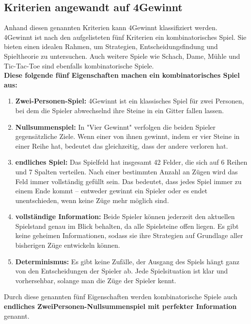 \subsection*{Kriterien angewandt auf 4Gewinnt}
Anhand diesen genannten Kriterien kann 4Gewinnt klassifiziert werden. 4Gewinnt ist nach den aufgelisteten fünf Kriterien ein kombinatorisches Spiel. Sie bieten einen idealen Rahmen, um Strategien, Entscheidungsfindung und Spieltheorie zu untersuchen. Auch weitere Spiele wie Schach, Dame, Mühle und Tic-Tac-Toe sind ebenfalls kombinatorische Spiele. \\

\textbf{Diese folgende fünf Eigenschaften machen ein kombinatorisches Spiel aus:}
\begin{enumerate}
	\item   \textbf{Zwei-Personen-Spiel: }4Gewinnt ist ein klassisches Spiel für zwei Personen, bei dem die Spieler abwechselnd ihre Steine in ein Gitter fallen lassen. 
	\item 	\textbf{Nullsummenspiel: }In "Vier Gewinnt" verfolgen die beiden Spieler gegensätzliche Ziele. Wenn einer von ihnen gewinnt, indem er vier Steine in einer Reihe hat, bedeutet das gleichzeitig, dass der andere verloren hat.
	\item 	\textbf{endliches Spiel: } Das Spielfeld hat insgesamt 42 Felder, die sich auf 6 Reihen und 7 Spalten verteilen. Nach einer bestimmten Anzahl an Zügen wird das Feld immer vollständig gefüllt sein. Das bedeutet, dass jedes Spiel immer zu einem Ende kommt – entweder gewinnt ein Spieler oder es endet unentschieden, wenn keine Züge mehr möglich sind.
	\item 	\textbf{vollständige Information: } Beide Spieler können jederzeit den aktuellen Spielstand genau im Blick behalten, da alle Spielsteine offen liegen. Es gibt keine geheimen Informationen, sodass sie ihre Strategien auf Grundlage aller bisherigen Züge entwickeln können.

	\item 	\textbf{Determinismus:} Es gibt keine Zufälle, der Ausgang des Spiels hängt ganz von den Entscheidungen der Spieler ab. Jede Spielsituation ist klar und vorhersehbar, solange man die Züge der Spieler kennt.
\end{enumerate}

Durch diese genannten fünf Eigenschaften werden kombinatorische Spiele auch \textbf{endliches ZweiPersonen-Nullsummenspiel mit perfekter Information} genannt\autocite{holler_einfuhrung_2019}.

